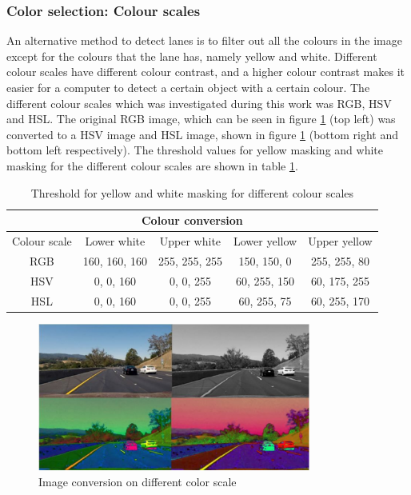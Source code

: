 \subsubsection*{Color selection: Colour scales}
An alternative method to detect lanes is to filter out all the colours in the image except for the colours that the lane has, namely yellow and white. Different colour scales have different colour contrast, and a higher colour contrast makes it easier for a computer to detect a certain object with a certain colour. The different colour scales which was investigated during this work was RGB, HSV and HSL.  The original RGB image, which can be seen in figure \ref{fig:color_scale} (top left) was converted to a HSV image and HSL image, shown in figure \ref{fig:color_scale} (bottom right and bottom left respectively). The threshold values for yellow masking and white masking for the different colour scales are shown in table \ref{tab:Colour_conversion}. 

\begin{table}[H]
    \centering
    \begin{tabular}{c|c|c|c|c}
         \multicolumn{5}{c}{\textbf{Colour conversion}} \\ \hline
         Colour scale & Lower white & Upper white & Lower yellow & Upper yellow \\ \hline
         RGB & 160, 160, 160 & 255, 255, 255  & 150, 150, 0  & 255, 255, 80\\
         HSV & 0, 0, 160 & 0, 0, 255  & 60, 255, 150  & 60, 175, 255 \\
         HSL & 0, 0, 160 & 0, 0, 255  & 60, 255, 75  & 60, 255, 170
    \end{tabular}
    \caption{Threshold for yellow and white masking for different colour scales}
    \label{tab:Colour_conversion}
\end{table}


\begin{figure}[H]
    \centering
    \includegraphics[width = 0.8\textwidth]{Figures/colorscale_2.pdf}
    \caption{Image conversion on different color scale}
    \label{fig:color_scale}
\end{figure}

